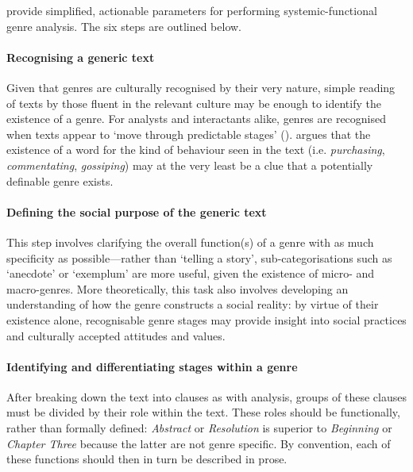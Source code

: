
\textcite{eggins_analysing_2004} provide simplified, actionable parameters for performing systemic\hyp{}functional genre analysis. The six steps are outlined below.

\paragraph{Recognising a generic text}

Given that genres are culturally recognised by their very nature, simple reading of texts by those fluent in the relevant culture may be enough to identify the existence of a genre. For analysts and interactants alike, genres are recognised when texts appear to `move through predictable stages' (\citeyear[p.~213]{eggins_analysing_2004}). \textcite{eggins_introduction_2004} argues that the existence of a word for the kind of behaviour seen in the text (i.e. \emph{purchasing}, \emph{commentating}, \emph{gossiping}) may at the very least be a clue that a potentially definable genre exists.

\paragraph{Defining the social purpose of the generic text}

This step involves clarifying the overall function(s) of a genre with as much specificity as possible---rather than `telling a story', sub\hyp{}categorisations such as `anecdote' or `exemplum' are more useful, given the existence of micro- and macro\hyp{}genres. More theoretically, this task also involves developing an understanding of how the genre constructs a social reality: by virtue of their existence alone, recognisable genre stages may provide insight into social practices and culturally accepted attitudes and values. 

\paragraph{Identifying and differentiating stages within a genre}

After breaking down the text into clauses as with  analysis, groups of these clauses must be divided by their role within the text. These roles should be functionally, rather than formally defined: \emph{Abstract} or \emph{Resolution} is superior to \emph{Beginning} or \emph{Chapter Three} because the latter are not genre specific. By convention, each of these functions should then in turn be described in prose.

